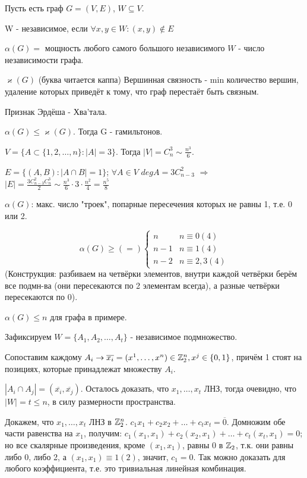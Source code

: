 Пусть есть граф $G = (V, E)$, $W \subseteq V$.

\Def W - независимое, если $\forall x, y \in W: (x, y) \notin E$

\Def $\alpha (G) = $ мощность любого самого большого независимого $W$ - число независимости графа.

\Def $\varkappa (G)$ (буква читается каппа) Вершинная связность - min количество вершин, удаление которых приведёт к тому, что граф перестаёт быть связным.

\Th Признак Эрдёша - Хва'тала.

$\alpha (G) \leqslant \varkappa (G)$. Тогда G - гамильтонов.

\Example $V = \{ A \subset \{1, 2, \dots, n \} : |A| = 3\}$. Тогда $|V| = C_n^3 \sim \frac{n^3}{6}$. 

$E = \{ (A, B): |A \cap B| = 1\}$; $\forall A \in V$ $deg A = 3 C_{n-3}^2$ $\Rightarrow$ $|E| = \frac{3 C_{n-3}^2 C_n^3}{2} \sim \frac{n^3}{6} \cdot 3 \cdot \frac{n^2}{4} = \frac{n^5}{8}$

$\alpha(G)$: макс. число "троек", попарные пересечения которых не равны 1, т.е. 0 или 2.

\begin{equation*}
\alpha(G) \geqslant (=) 
 \begin{cases}
   n &\text{$n \equiv 0 (4)$}\\
   n-1 &\text{$n \equiv 1 (4)$} \\
   n-2 &\text{$n \equiv 2, 3 (4)$}
 \end{cases}
\end{equation*}
(Конструкция: разбиваем на четвёрки элементов, внутри каждой четвёрки берём все подмн-ва (они пересекаются по 2 элементам всегда), а разные четвёрки пересекаются по 0).

\Th $\alpha(G) \leqslant n$ для графа в примере.

\Proof Зафиксируем $W = \{ A_1, A_2, \dots, A_t \}$ - независимое подмножество. 

Сопоставим каждому $A_i \rightarrow \overline{x_i} = (x^1, \dots, x^n) \in \mathbb{Z}_2^n, x^j \in \{0, 1\}$, причём 1 стоят на позициях, которые принадлежат множеству $A_i$.

$|A_i \cap A_j| = (\overline{x_i}, \overline{x_j})$. Осталось доказать, что $x_1, \dots, x_t$ ЛНЗ, тогда очевидно, что $|W| = t \leqslant n$, в силу размерности пространства.

Докажем, что $x_1, \dots, x_t$ ЛНЗ в $\mathbb{Z}_2^n$. $c_1x_1 + c_2x_2 + \dots + c_tx_t = \overline{0}$. Домножим обе части равенства на $x_1$, получим: $c_1(x_1, x_1) + c_2 (x_2, x_1) + \dots + c_t (x_t, x_1) = 0$; но все скалярные произведения, кроме $(x_1, x_1)$, равны 0 в $\mathbb{Z}_2$, т.к. они равны либо 0, либо 2, а $(x_1, x_1) \equiv 1 (2)$, значит, $c_1 = 0$. Так можно доказать для любого коэффициента, т.е. это тривиальная линейная комбинация. \EndProof

